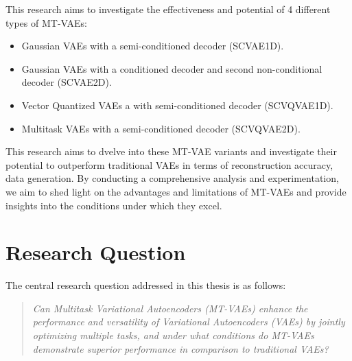 This research aims to investigate the effectiveness and potential of 4 different types of MT-VAEs:
\begin{itemize}
    \item Gaussian VAEs with a semi-conditioned decoder (SCVAE1D).
    \item Gaussian VAEs with a conditioned decoder and second non-conditional decoder (SCVAE2D).
    \item Vector Quantized VAEs a with semi-conditioned decoder (SCVQVAE1D).
    \item Multitask VAEs with a semi-conditioned decoder (SCVQVAE2D).
\end{itemize}

This research aims to dvelve into these MT-VAE variants and investigate their potential to outperform traditional VAEs in terms of reconstruction accuracy, data generation. By conducting a comprehensive analysis and experimentation, we aim to shed light on the advantages and limitations of MT-VAEs and provide insights into the conditions under which they excel.

\section{Research Question}

The central research question addressed in this thesis is as follows:

\begin{quote}
\textit{Can Multitask Variational Autoencoders (MT-VAEs) enhance the performance and versatility of Variational Autoencoders (VAEs) by jointly optimizing multiple tasks, and under what conditions do MT-VAEs demonstrate superior performance in comparison to traditional VAEs?}
\end{quote}



